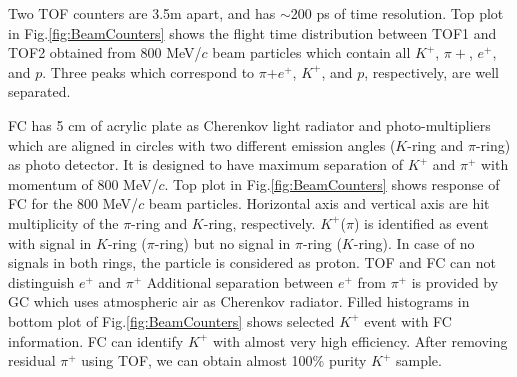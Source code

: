 Two TOF counters are 3.5m apart, and has $\sim$200 ps of time resolution.
Top plot in Fig.\ref{fig:BeamCounters} shows the flight time distribution between TOF1 and TOF2
obtained from 800 MeV/$c$ beam particles which contain all $K^{+}$, $\pi{+}$, $e^{+}$, and $p$. 
Three peaks which correspond to $\pi$+$e^+$, $K^+$, and $p$, respectively, are well separated.

FC has 5 cm of acrylic plate as Cherenkov light radiator and 
photo-multipliers which are aligned in circles with two different emission angles
($K$-ring and $\pi$-ring) as photo detector.
It is designed to have maximum separation of $K^{+}$ and $\pi^{+}$ with momentum of 800 MeV/$c$.
Top plot in Fig.\ref{fig:BeamCounters} shows response of FC for the 800 MeV/$c$ beam particles. 
Horizontal axis and vertical axis are hit multiplicity of the $\pi$-ring and $K$-ring, respectively. 
$K^+$($\pi$) is identified as event with signal in $K$-ring ($\pi$-ring) but no signal in $\pi$-ring ($K$-ring).
In case of no signals in both rings, the particle is considered as proton.
TOF and FC can not distinguish $e^{+}$ and $\pi^+$
Additional separation between $e^{+}$ from $\pi^+$ is provided by GC which uses atmospheric air as
Cherenkov radiator. 
Filled histograms in bottom plot of Fig.\ref{fig:BeamCounters} shows selected $K^+$ event with FC information.
FC can identify $K^+$ with almost very high efficiency. After removing residual $\pi^+$ using TOF, we can obtain
almost 100\% purity $K^+$ sample.


